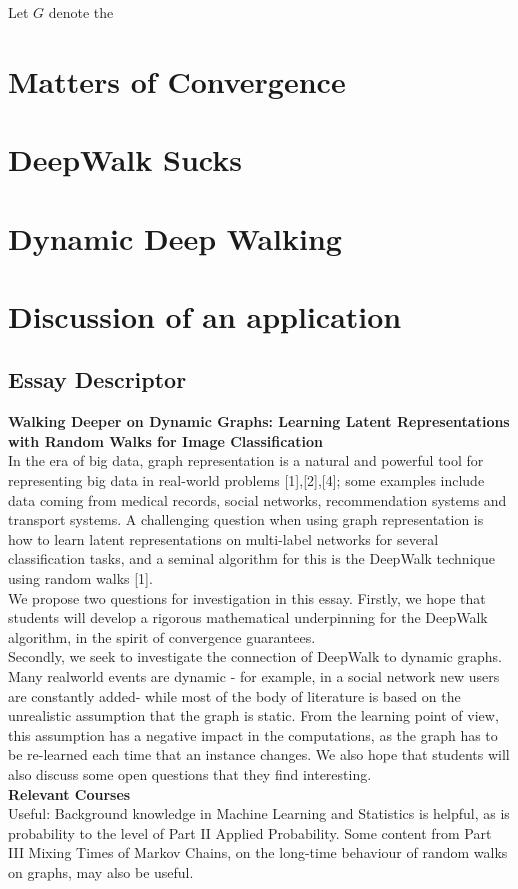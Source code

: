 \documentclass[a4paper]{article}
\begin{document}
Let $G$ denote the 
\section{Matters of Convergence}
\section{DeepWalk Sucks}
\section{Dynamic Deep Walking}
\section{Discussion of an application}
\subsection*{Essay Descriptor}
\textbf{Walking Deeper on Dynamic Graphs: Learning Latent Representations
with Random Walks for Image Classification}\\
In the era of big data, graph representation is a natural and powerful tool for representing big
data in real-world problems [1],[2],[4]; some examples include data coming from medical records,
social networks, recommendation systems and transport systems. A challenging question when
using graph representation is how to learn latent representations on multi-label networks for
several classification tasks, and a seminal algorithm for this is the DeepWalk technique using
random walks [1].\\
We propose two questions for investigation in this essay. Firstly, we hope that students will
develop a rigorous mathematical underpinning for the DeepWalk algorithm, in the spirit of
convergence guarantees.\\
Secondly, we seek to investigate the connection of DeepWalk to dynamic graphs. Many realworld events are dynamic - for example, in a social network new users are constantly added- while
most of the body of literature is based on the unrealistic assumption that the graph is static.
From the learning point of view, this assumption has a negative impact in the computations, as the graph has to be re-learned each time that an instance changes. We also hope that students
will also discuss some open questions that they find interesting.\\
\textbf{Relevant Courses}\\
Useful: Background knowledge in Machine Learning and Statistics is helpful, as is probability
to the level of Part II Applied Probability. Some content from Part III Mixing Times of Markov
Chains, on the long-time behaviour of random walks on graphs, may also be useful.\\






\printindex
\end{document}
